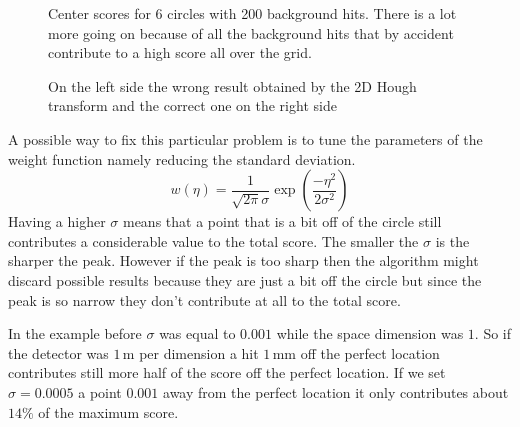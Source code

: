 \documentclass[11pt,twoside]{scrreprt}
\begin{document}
\begin{figure}
\centering

  \caption[Center scores for 6 circles with 200 background hits.]{Center scores for 6 circles with 200 background hits. There is a lot more going on because of all the background hits that by accident contribute to a high score all over the grid.}

\caption{On the left side the wrong result obtained by the 2D Hough transform and the correct one on the right side}
\end{figure}

A possible way to fix this particular problem is to tune the parameters of the weight function namely reducing the standard deviation. 
\[
  w(\eta) = \frac{1}{\sqrt{2\pi}\sigma}\exp\left( \frac{-\eta^2}{2\sigma^2}\right)
\]
Having a higher $\sigma$ means that a point that is a bit off of the circle still contributes a considerable value to the total score. The smaller the $\sigma$ is the sharper the peak. However if the peak is too sharp then the algorithm might discard possible results because they are just a bit off the circle but since the peak is so narrow they don't contribute at all to the total score.

In the example before $\sigma$ was equal to $0.001$ while the space dimension was $1$. So if the detector was $1$\,m per dimension a hit $1$\,mm off the perfect location contributes still more half of the score off the perfect location. If we set $\sigma=0.0005$ a point $0.001$ away from the perfect location it only contributes about $14\%$ of the maximum score.
\end{document}
